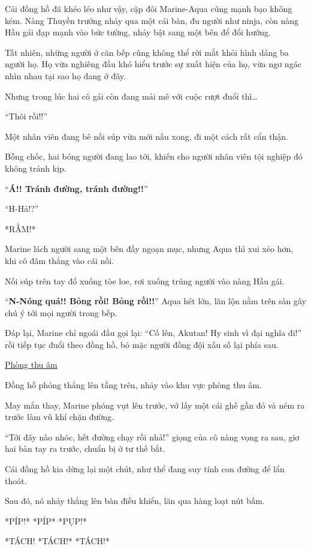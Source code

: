 \documentclass[../main.tex]{subfiles}
\begin{document}
Cái đồng hồ đã khéo léo như vậy, cặp đôi Marine-Aqua cũng mạnh bạo không kém. Nàng Thuyền trưởng nhảy qua một cái bàn, đu người như ninja, còn nàng Hầu gái đạp mạnh vào bức tường, nhảy bật sang một bên để đổi hướng.

Tất nhiên, những người ở căn bếp cũng không thể rời mắt khỏi hình dáng ba người họ. Họ vừa nghiêng đầu khó hiểu trước sự xuất hiện của họ, vừa ngơ ngác nhìn nhau tại sao họ đang ở đây.

Nhưng trong lúc hai cô gái còn đang mải mê với cuộc rượt đuổi thì\dots

``Thôi rồi!!''

Một nhân viên đang bê nồi súp vừa mới nấu xong, đi một cách rất cẩn thận.

Bỗng chốc, hai bóng người đang lao tới, khiến cho người nhân viên tội nghiệp đó không tránh kịp.

``\textbf{Á!! Tránh đường, tránh đường!!}''

``H-Hả!?''

*RẦM!*

Marine lách người sang một bên đầy ngoạn mục, nhưng Aqua thì xui xẻo hơn, khi cô đâm thẳng vào cái nồi.

Nồi súp trên tay đổ xuống tòe loe, rơi xuống trúng người vào nàng Hầu gái.

``\textbf{N-Nóng quá!! Bỏng rồi! Bỏng rồi!!}'' Aqua hét lớn, lăn lộn nằm trên sàn gây chú ý tới mọi người trong bếp.

Đáp lại, Marine chỉ ngoái đầu gọi lại: ``Cố lên, Akutan! Hy sinh vì đại nghĩa đi!'' rồi tiếp tục đuổi theo đồng hồ, bỏ mặc người đồng đội xấu số lại phía sau.

\begin{center}
    \uline{Phòng thu âm}
\end{center}

Đồng hồ phóng thẳng lên tầng trên, nhảy vào khu vực phòng thu âm.

May mắn thay, Marine phóng vụt lên trước, vớ lấy một cái ghế gần đó và ném ra trước làm vũ khí chặn đường.

``Tới đây nào nhóc, hết đường chạy rồi nhá!'' giọng của cô nàng vọng ra sau, giơ hai bàn tay ra trước, chuẩn bị ở tư thế bắt.

Cái đồng hồ kia dừng lại một chút, như thể đang suy tính con đường để lẩn thoát.

Sau đó, nó nhảy thẳng lên bàn điều khiển, lăn qua hàng loạt nút bấm.

*PÍP!* *PÍP* *PỤP!*

*TÁCH! *TÁCH!* *TÁCH!*
\end{document}
